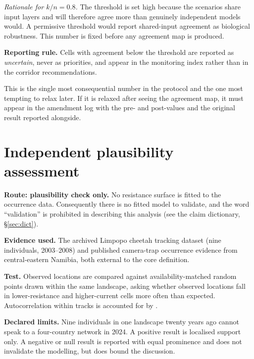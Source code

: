 \emph{Rationale for $k/n = 0.8$.} The threshold is set high because the
scenarios share input layers and will therefore agree more than genuinely
independent models would. A permissive threshold would report shared-input
agreement as biological robustness. This number is fixed before any agreement
map is produced.

\textbf{Reporting rule.} Cells with agreement below the threshold are reported
as \emph{uncertain}, never as priorities, and appear in the monitoring index
rather than in the corridor recommendations.

 This is the single most consequential number in
the protocol and the one most tempting to relax later. If it is relaxed after
seeing the agreement map, it must appear in the amendment log with the pre- and
post-values and the original result reported alongside.

\section{Independent plausibility assessment}

\textbf{Route: plausibility check only.} No resistance surface is fitted to the
occurrence data. Consequently there is no fitted model to validate, and the word
``validation'' is prohibited in describing this analysis (see the claim
dictionary, \S\ref{sec:dict}).

\textbf{Evidence used.} The archived Limpopo cheetah tracking dataset
(nine individuals, 2003--2008) and published camera-trap occurrence evidence
from central-eastern Namibia, both external to the core definition.

\textbf{Test.} Observed locations are compared against availability-matched
random points drawn within the same landscape, asking whether observed locations
fall in lower-resistance and higher-current cells more often than expected.
Autocorrelation within tracks is accounted for by .

\textbf{Declared limits.} Nine individuals in one landscape twenty years ago
cannot speak to a four-country network in 2024. A positive result is localised
support only. A negative or null result is reported with equal prominence and
does not invalidate the modelling, but does bound the discussion.

